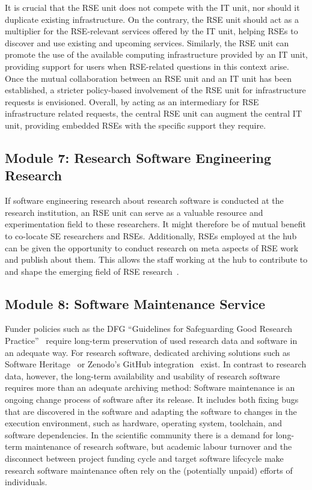 \documentclass[10pt,letterpaper]{article}
\begin{document}
It is crucial that the RSE unit does not compete with the IT unit, nor should it duplicate existing infrastructure.
On the contrary, the RSE unit should act as a multiplier for the RSE-relevant services offered by the IT unit, helping RSEs to discover and use existing and upcoming services.
Similarly, the RSE unit can promote the use of the available computing infrastructure provided by an IT unit, providing support for users when RSE-related questions in this context arise.
Once the mutual collaboration between an RSE unit and an IT unit has been established, a stricter policy-based involvement of the RSE unit for infrastructure requests is envisioned.
Overall, by acting as an intermediary for RSE infrastructure related requests, the central RSE unit can augment the central IT unit, providing embedded RSEs with the specific support they require.

\subsection*{Module 7: Research Software Engineering Research}%
\label{sec:rseresearch}

If software engineering research about research software is conducted at the research institution, an RSE unit can serve as a valuable resource and experimentation field to these researchers.
It might therefore be of mutual benefit to co-locate SE researchers and RSEs.
Additionally, RSEs employed at the hub can be given the opportunity to conduct research on meta aspects of RSE work and publish about them.
This allows the staff working at the hub to contribute to and shape the emerging field of RSE research~\cite{Felderer_2025}.

\subsection*{Module 8: Software Maintenance Service}%
\label{sec:maintenance}

Funder policies such as the DFG “Guidelines for Safeguarding Good Research Practice”~\cite{dfg_gsp} require long-term preservation of used research data and software in an adequate way.
For research software, dedicated archiving solutions such as Software Heritage~\cite{DiCosmo2020,DiCosmo2023} or Zenodo's GitHub integration~\cite{GitHubZenodo} exist.
In contrast to research data, however, the long-term availability and usability of research software requires more than an adequate archiving method:
Software maintenance is an ongoing change process of software after its release.
It includes both fixing bugs that are discovered in the software and adapting the software to changes in the execution environment, such as hardware, operating system, toolchain, and software dependencies.
In the scientific community there is a demand for long-term maintenance of research software,
 but academic labour turnover and the disconnect between project funding cycle and target software lifecycle make research software maintenance often rely on the (potentially unpaid) efforts of individuals.
\end{document}
